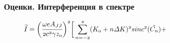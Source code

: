 \documentclass[14pt, hyperref = {colorlinks}]{beamer}
\begin{document}
\small
\begin{frame}
\frametitle{Оценки. Интерференция в спектре}\label{t1}
\vspace{-5pt}
\begin{figure}[h]
	\begin{minipage}[h]{0.49\linewidth}
		\vspace{-10pt}
	\end{minipage}	
	\begin{minipage}[h]{0.49\linewidth}
		\vspace{-10pt}
	\end{minipage}
\end{figure}
\vspace{-15pt}
\begin{figure}[h]
	$\mathnormal{{\widetilde{I}} =
	\bigg(\cfrac{\omega eA_{JJ}}{2c^2 \gamma z_0}\bigg)^2\bigg[
	\displaystyle\sum\limits_{n =-2}^{2}(K_0 + n\Delta K)^2sinc^2(\hat{C_n}) + }$\\
	

\end{figure}
\end{frame}
\end{document}
